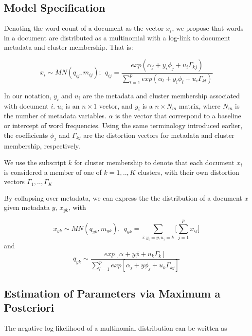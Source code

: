 \documentclass[12pt]{article}
\begin{document}
\subsection{Model Specification}\label{model-specification}

Denoting the word count of a document as the vector $x_i$, we propose
that words in a document are distributed as a multinomial with a
log-link to document metadata and cluster membership. That is:

\begin{equation}
 x_{i} \sim MN(q_{ij},m_{ij})    ; ~~  q_{ij} = \frac{exp(\alpha_j + y_i \phi_j + u_i \Gamma_{kj})}{\sum_{l=1}^{p}{exp(\alpha_l+ y_i \phi_l + u_i \Gamma_{kl})}}
\end{equation} 


In our notation, $y_i$ and $u_i$ are the metadata and cluster membership associated
with document $i$. $u_i$ is an $n \times 1$ vector, and $y_i$ is a $n  \times N_m$ matrix, where $N_m$ is the number of metadata variables. $\alpha$ is the vector that correspond to a baseline or intercept of word frequencies. 
Using the same terminology introduced earlier, the coefficients $\phi_j$ and $\Gamma_{kj}$ are the distortion
vectors for metadata and cluster membership, respectively.

 We use
the subscript $k$ for cluster membership to denote that each document $x_i$ is considered a
member of one of $k = 1,..,K$ clusters, with their own distortion vectors
$\Gamma_1,..,\Gamma_K$

By collapsing over metadata, we can express the the distribution of a document $x$ given metadata $y$, $x_{yk}$, with

\begin{equation}
 x_{yk} \sim MN(q_{yk},m_{yk}), ~ ~ q_{yk} = \sum\limits_{i: y_i = y, u_i = k} \big[\sum_{j = 1}^{p} {x_{ij}} \big]
\end{equation}
and 
\begin{equation}
q_{yk} \sim \frac{exp[\alpha + y \phi  + u_k \Gamma_{k}]}{\sum_{l=1}^{p} exp[\alpha_j + y \phi_j+ u_k \Gamma_{kj} ]}
\end{equation}

\subsection{Estimation of Parameters via Maximum a
Posteriori}\label{estimation-of-parameters-via-maximum-a-posteriori}

The negative log likelihood of a multinomial distribution can be written
as
\end{document}
